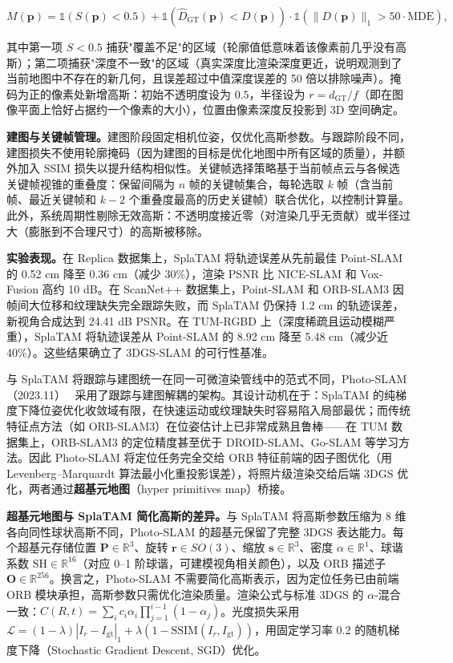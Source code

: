 \begin{equation*}
M(\mathbf{p}) = \mathbb{1}(S(\mathbf{p}) < 0.5) + \mathbb{1}\!\left(\hat{D}_{\mathrm{GT}}(\mathbf{p}) < D(\mathbf{p})\right) \cdot \mathbb{1}\!\left(\|D(\mathbf{p})\|_1 > 50 \cdot \mathrm{MDE}\right),
\end{equation*}

其中第一项 $S < 0.5$ 捕获"覆盖不足"的区域（轮廓值低意味着该像素前几乎没有高斯）；第二项捕获"深度不一致"的区域（真实深度比渲染深度更近，说明观测到了当前地图中不存在的新几何，且误差超过中值深度误差的 50 倍以排除噪声）。掩码为正的像素处新增高斯：初始不透明度设为 $0.5$，半径设为 $r = d_{\mathrm{GT}} / f$（即在图像平面上恰好占据约一个像素的大小），位置由像素深度反投影到 3D 空间确定。

\textbf{建图与关键帧管理。}建图阶段固定相机位姿，仅优化高斯参数。与跟踪阶段不同，建图损失不使用轮廓掩码（因为建图的目标是优化地图中所有区域的质量），并额外加入 SSIM 损失以提升结构相似性。关键帧选择策略基于当前帧点云与各候选关键帧视锥的重叠度：保留间隔为 $n$ 帧的关键帧集合，每轮选取 $k$ 帧（含当前帧、最近关键帧和 $k-2$ 个重叠度最高的历史关键帧）联合优化，以控制计算量。此外，系统周期性剔除无效高斯：不透明度接近零（对渲染几乎无贡献）或半径过大（膨胀到不合理尺寸）的高斯被移除。

\textbf{实验表现。}在 Replica 数据集上，SplaTAM 将轨迹误差从先前最佳 Point-SLAM 的 0.52 cm 降至 0.36 cm（减少 30\%），渲染 PSNR 比 NICE-SLAM 和 Vox-Fusion 高约 10 dB。在 ScanNet++ 数据集上，Point-SLAM 和 ORB-SLAM3 因帧间大位移和纹理缺失完全跟踪失败，而 SplaTAM 仍保持 1.2 cm 的轨迹误差，新视角合成达到 24.41 dB PSNR。在 TUM-RGBD 上（深度稀疏且运动模糊严重），SplaTAM 将轨迹误差从 Point-SLAM 的 8.92 cm 降至 5.48 cm（减少近 40\%）。这些结果确立了 3DGS-SLAM 的可行性基准。

与 SplaTAM 将跟踪与建图统一在同一可微渲染管线中的范式不同，Photo-SLAM（2023.11）~\cite{2311_16728} 采用了跟踪与建图解耦的架构。其设计动机在于：SplaTAM 的纯梯度下降位姿优化收敛域有限，在快速运动或纹理缺失时容易陷入局部最优；而传统特征点方法（如 ORB-SLAM3）在位姿估计上已非常成熟且鲁棒——在 TUM 数据集上，ORB-SLAM3 的定位精度甚至优于 DROID-SLAM、Go-SLAM 等学习方法。因此 Photo-SLAM 将定位任务完全交给 ORB 特征前端的因子图优化（用 Levenberg--Marquardt 算法最小化重投影误差），将照片级渲染交给后端 3DGS 优化，两者通过\textbf{超基元地图}（hyper primitives map）桥接。

\textbf{超基元地图与 SplaTAM 简化高斯的差异。}与 SplaTAM 将高斯参数压缩为 8 维各向同性球状高斯不同，Photo-SLAM 的超基元保留了完整 3DGS 表达能力。每个超基元存储位置 $\mathbf{P} \in \mathbb{R}^3$、旋转 $\mathbf{r} \in SO(3)$、缩放 $\mathbf{s} \in \mathbb{R}^3$、密度 $\alpha \in \mathbb{R}^1$、球谐系数 $\text{SH} \in \mathbb{R}^{16}$（对应 0--1 阶球谐，可建模视角相关颜色），以及 ORB 描述子 $\mathbf{O} \in \mathbb{R}^{256}$。换言之，Photo-SLAM 不需要简化高斯表示，因为定位任务已由前端 ORB 模块承担，高斯参数只需优化渲染质量。渲染公式与标准 3DGS 的 $\alpha$-混合一致：$C(R,t) = \sum_{i} c_i \alpha_i \prod_{j=1}^{i-1}(1-\alpha_j)$。光度损失采用 $\mathcal{L} = (1-\lambda)|I_r - I_{\text{gt}}|_1 + \lambda(1-\text{SSIM}(I_r, I_{\text{gt}}))$，用固定学习率 0.2 的随机梯度下降（Stochastic Gradient Descent, SGD）优化。

